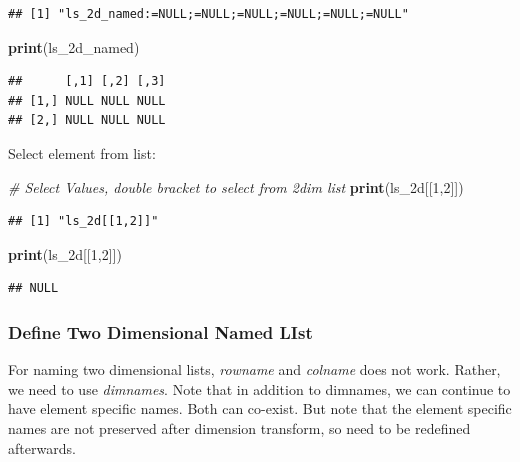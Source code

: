 \documentclass[
]{book}
\newenvironment{Shaded}{\begin{snugshade}}{\end{snugshade}}
\newcommand{\CommentTok}[1]{\textcolor[rgb]{0.56,0.35,0.01}{\textit{#1}}}
\newcommand{\DecValTok}[1]{\textcolor[rgb]{0.00,0.00,0.81}{#1}}
\newcommand{\KeywordTok}[1]{\textcolor[rgb]{0.13,0.29,0.53}{\textbf{#1}}}
\newcommand{\NormalTok}[1]{#1}
\newcommand{\StringTok}[1]{\textcolor[rgb]{0.31,0.60,0.02}{#1}}
\begin{document}
\begin{verbatim}
## [1] "ls_2d_named:=NULL;=NULL;=NULL;=NULL;=NULL;=NULL"
\end{verbatim}

\begin{Shaded}
\begin{Highlighting}[]
\KeywordTok{print}\NormalTok{(ls\_2d\_named)}
\end{Highlighting}
\end{Shaded}

\begin{verbatim}
##      [,1] [,2] [,3]
## [1,] NULL NULL NULL
## [2,] NULL NULL NULL
\end{verbatim}

Select element from list:

\begin{Shaded}
\begin{Highlighting}[]
\CommentTok{\# Select Values, double bracket to select from 2dim list}
\KeywordTok{print}\NormalTok{(}\StringTok{\textquotesingle{}ls\_2d[[1,2]]\textquotesingle{}}\NormalTok{)}
\end{Highlighting}
\end{Shaded}

\begin{verbatim}
## [1] "ls_2d[[1,2]]"
\end{verbatim}

\begin{Shaded}
\begin{Highlighting}[]
\KeywordTok{print}\NormalTok{(ls\_2d[[}\DecValTok{1}\NormalTok{,}\DecValTok{2}\NormalTok{]])}
\end{Highlighting}
\end{Shaded}

\begin{verbatim}
## NULL
\end{verbatim}

\hypertarget{define-two-dimensional-named-list}{%
\subsubsection{Define Two Dimensional Named LIst}\label{define-two-dimensional-named-list}}

For naming two dimensional lists, \emph{rowname} and \emph{colname} does not work. Rather, we need to use \emph{dimnames}. Note that in addition to dimnames, we can continue to have element specific names. Both can co-exist. But note that the element specific names are not preserved after dimension transform, so need to be redefined afterwards.
\end{document}
